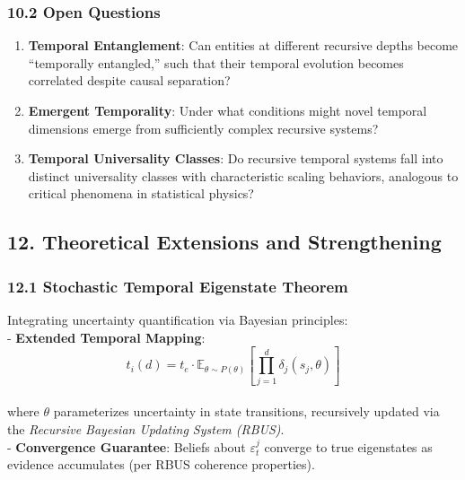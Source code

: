 \documentclass[
]{article}
\begin{document}
\subsubsection{10.2 Open Questions}\label{open-questions}

\begin{enumerate}
\def\labelenumi{\arabic{enumi}.}
\item
  \textbf{Temporal Entanglement}: Can entities at different recursive
  depths become ``temporally entangled,'' such that their temporal
  evolution becomes correlated despite causal separation?
\item
  \textbf{Emergent Temporality}: Under what conditions might novel
  temporal dimensions emerge from sufficiently complex recursive
  systems?
\item
  \textbf{Temporal Universality Classes}: Do recursive temporal systems
  fall into distinct universality classes with characteristic scaling
  behaviors, analogous to critical phenomena in statistical physics?
\end{enumerate}

\subsection{\texorpdfstring{\textbf{12. Theoretical Extensions and
Strengthening}}{12. Theoretical Extensions and Strengthening}}\label{theoretical-extensions-and-strengthening}

\subsubsection{\texorpdfstring{\textbf{12.1 Stochastic Temporal
Eigenstate
Theorem}}{12.1 Stochastic Temporal Eigenstate Theorem}}\label{stochastic-temporal-eigenstate-theorem}

Integrating uncertainty quantification via Bayesian principles:\\
- \textbf{Extended Temporal Mapping}:\\
\[t_i(d) = t_e \cdot \mathbb{E}_{\theta \sim P(\theta)}\left[\prod_{j=1}^{d} \delta_j(s_j, \theta)\right]\]\\
where \(\theta\) parameterizes uncertainty in state transitions,
recursively updated via the \emph{Recursive Bayesian Updating System
(RBUS)}.\\
- \textbf{Convergence Guarantee}: Beliefs about \(\varepsilon_t^j\)
converge to true eigenstates as evidence accumulates (per RBUS coherence
properties).
\end{document}
